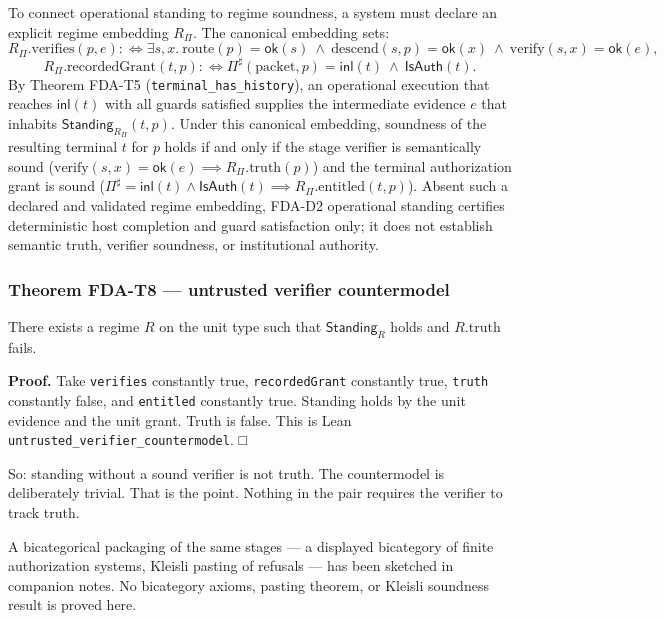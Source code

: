 \documentclass[
  11pt,
]{article}
\begin{document}
To connect operational standing to regime soundness, a system must declare an explicit regime embedding \(R_\Pi\). The canonical embedding sets:
\[
R_\Pi.\mathrm{verifies}(p,e) :\iff \exists s,x.\ \mathrm{route}(p)=\mathsf{ok}(s)\ \wedge\ \mathrm{descend}(s,p)=\mathsf{ok}(x)\ \wedge\ \mathrm{verify}(s,x)=\mathsf{ok}(e),
\]
\[
R_\Pi.\mathrm{recordedGrant}(t,p) :\iff \Pi^\sharp(\mathrm{packet},p)=\mathsf{inl}(t)\ \wedge\ \mathsf{IsAuth}(t).
\]
By Theorem FDA-T5 (\nolinkurl{terminal_has_history}), an operational execution that reaches \(\mathsf{inl}(t)\) with all guards satisfied supplies the intermediate evidence \(e\) that inhabits \(\mathsf{Standing}_{R_\Pi}(t,p)\). Under this canonical embedding, soundness of the resulting terminal \(t\) for \(p\) holds if and only if the stage verifier is semantically sound (\(\mathrm{verify}(s,x)=\mathsf{ok}(e)\implies R_\Pi.\mathrm{truth}(p)\)) and the terminal authorization grant is sound (\(\Pi^\sharp=\mathsf{inl}(t)\wedge\mathsf{IsAuth}(t)\implies R_\Pi.\mathrm{entitled}(t,p)\)). Absent such a declared and validated regime embedding, FDA-D2 operational standing certifies deterministic host completion and guard satisfaction only; it does not establish semantic truth, verifier soundness, or institutional authority.

\subsubsection{Theorem FDA-T8 --- untrusted verifier countermodel}\label{theorem-fda-t8-untrusted-verifier-countermodel}

There exists a regime \(R\) on the unit type such that \(\mathsf{Standing}_R\) holds and \(R.\mathrm{truth}\) fails.

\textbf{Proof.} Take \texttt{verifies} constantly true, \texttt{recordedGrant} constantly true, \texttt{truth} constantly false, and \texttt{entitled} constantly true. Standing holds by the unit evidence and the unit grant. Truth is false. This is Lean \nolinkurl{untrusted_verifier_countermodel}. □

So: standing without a sound verifier is not truth. The countermodel is deliberately trivial. That is the point. Nothing in the pair requires the verifier to track truth.

A bicategorical packaging of the same stages --- a displayed bicategory of finite authorization systems, Kleisli pasting of refusals --- has been sketched in companion notes. No bicategory axioms, pasting theorem, or Kleisli soundness result is proved here.
\end{document}
